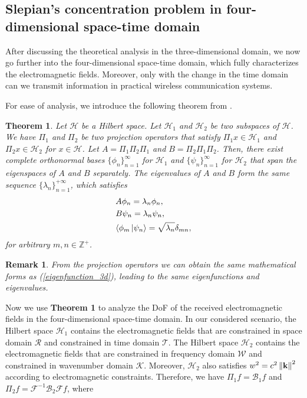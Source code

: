 \documentclass[12pt,draftclsnofoot,journal,onecolumn]{IEEEtran}
\newtheorem{theorem}{Theorem}
\newtheorem{remark}{Remark}
\begin{document}
	\subsection{Slepian's concentration problem in four-dimensional space-time domain}
	\label{subsec_4d_slepian}
	
	After discussing the theoretical analysis in the three-dimensional domain, we now go further into the four-dimensional space-time domain, which fully characterizes the electromagnetic fields. Moreover, only with the change in the time domain can we transmit information in practical wireless communication systems.
	
	For ease of analysis, we introduce the following theorem from \cite{ihara1993information}.
	
	\begin{theorem}
		\cite{ihara1993information} Let $\mathcal{H}$ be a Hilbert space. Let $\mathcal{H}_1$ and $\mathcal{H}_2$ be two subspaces of $\mathcal{H}$. We have $\Pi_1$ and $\Pi_2$ be two projection operators that satisfy $\Pi_1 x \in \mathcal{H}_1$ and $\Pi_2 x \in \mathcal{H}_2$ for $x \in \mathcal{H}$. Let $A = \Pi_1 \Pi_2 \Pi_1$ and $B = \Pi_2 \Pi_1 \Pi_2$. Then, there exist complete orthonormal bases $\{\phi_n \}_{n=1}^{\infty}$ for $\mathcal{H}_1$ and $\{\psi_n \}_{n=1}^{\infty}$ for $\mathcal{H}_2$ that span the eigenspaces of $A$ and $B$ separately. The eigenvalues of $A$ and $B$ form the same sequence $\{\lambda_n \}_{n=1}^{+\infty}$, which satisfies
		\begin{subequations}
			\begin{align} 
				&A\phi_n = \lambda_n \phi_n, \label{Aphi}\\
				& B \psi_n = \lambda_n \psi_n,  \label{Bpsi}\\
				& \langle \phi_m \ket{\psi_n} = \sqrt{\lambda_n} \delta_{mn},
			\end{align}
		\end{subequations}
		for arbitrary $m,n\in \mathbb{Z}^+$.
	\end{theorem}
	\begin{remark}
		From the projection operators we can obtain the same mathematical forms as (\ref{eigenfunction_3d}), leading to the same eigenfunctions and eigenvalues. 
	\end{remark}
	Now we use {\bf Theorem 1} to analyze the DoF of the received electromagnetic fields in the four-dimensional space-time domain. In our considered scenario, the Hilbert space $\mathcal{H}_1$ contains the electromagnetic fields that are constrained in space domain $\mathcal{R}$ and constrained in time domain $\mathcal{T}$. The Hilbert space $\mathcal{H}_2$ contains the electromagnetic fields that are constrained in frequency domain $\mathcal{W}$ and constrained in wavenumber domain $\mathcal{K}$. Moreover, $\mathcal{H}_2$ also satisfies $w^2 = c^2\left\| {\bf k} \right\|^2 $ according to electromagnetic constraints. Therefore, we have $\Pi_1f = \mathcal{B}_1 f $ and $\Pi_2 f = \mathcal{F}^{-1} \mathcal{B}_2 \mathcal{F} f$, where 
\end{document}
